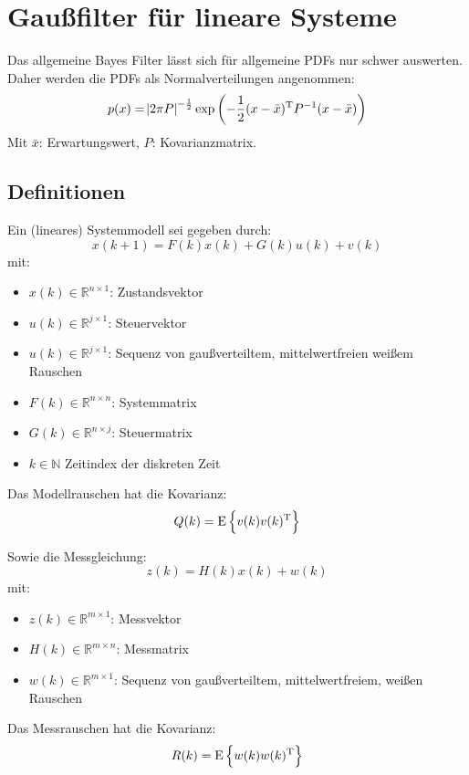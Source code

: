 \chapter{Gaußfilter für lineare Systeme}
Das allgemeine Bayes Filter lässt sich für allgemeine PDFs nur schwer auswerten. 
Daher werden die PDFs als Normalverteilungen angenommen:
\begin{equation*}
    p(x) = \abs{2 \pi P}^{-\frac{1}{2}} \exp \left(-\frac{1}{2} (x - \bar{x})^\text{T} P^{-1} (x-\bar{x}) \right)
\end{equation*}
Mit $\bar{x}$: Erwartungswert, $P$: Kovarianzmatrix.

\section{Definitionen}
Ein (lineares) Systemmodell sei gegeben durch:
\begin{equation*}
    x(k+1) = F(k) x(k) + G(k) u(k) + v(k)
\end{equation*}
mit:
\begin{itemize}
    \item $x(k) \in \mathbb{R}^{n \times 1}$: Zustandsvektor
    \item $u(k) \in \mathbb{R}^{j \times 1}$: Steuervektor
    \item $u(k) \in \mathbb{R}^{j \times 1}$: Sequenz von gaußverteiltem, mittelwertfreien weißem Rauschen
    \item $F(k) \in \mathbb{R}^{n \times n}$: Systemmatrix
    \item $G(k) \in \mathbb{R}^{n \times j}$: Steuermatrix
    \item $k \in \mathbb{N}$ Zeitindex der diskreten Zeit
\end{itemize}
Das Modellrauschen hat die Kovarianz:
\begin{equation*}
    Q(k) = \operatorname*{E}\left\{v(k)v(k)^\text{T}\right\}
\end{equation*}

Sowie die Messgleichung:
\begin{equation*}
    z(k) = H(k) x(k) + w(k)
\end{equation*}
mit:
\begin{itemize}
    \item $z(k) \in \mathbb{R}^{m \times 1}$: Messvektor
    \item $H(k) \in \mathbb{R}^{m \times n}$: Messmatrix
    \item $w(k) \in \mathbb{R}^{m \times 1}$: Sequenz von gaußverteiltem, mittelwertfreiem, weißen Rauschen
\end{itemize}
Das Messrauschen hat die Kovarianz:
\begin{equation*}
    R(k) = \operatorname*{E}\left\{w(k)w(k)^\text{T}\right\}
\end{equation*}


